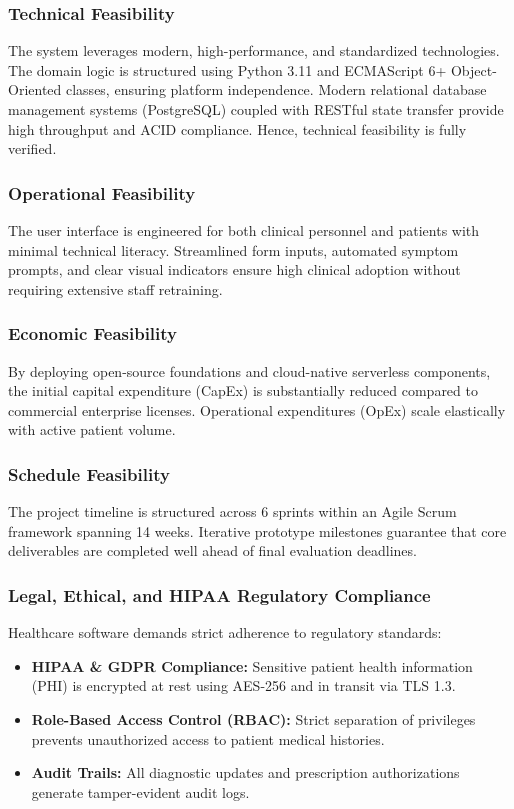 \documentclass[11pt,a4paper]{article}
\begin{document}
\subsubsection{Technical Feasibility}
The system leverages modern, high-performance, and standardized technologies. The domain logic is structured using Python 3.11 and ECMAScript 6+ Object-Oriented classes, ensuring platform independence. Modern relational database management systems (PostgreSQL) coupled with RESTful state transfer provide high throughput and ACID compliance. Hence, technical feasibility is fully verified.

\subsubsection{Operational Feasibility}
The user interface is engineered for both clinical personnel and patients with minimal technical literacy. Streamlined form inputs, automated symptom prompts, and clear visual indicators ensure high clinical adoption without requiring extensive staff retraining.

\subsubsection{Economic Feasibility}
By deploying open-source foundations and cloud-native serverless components, the initial capital expenditure (CapEx) is substantially reduced compared to commercial enterprise licenses. Operational expenditures (OpEx) scale elastically with active patient volume.

\subsubsection{Schedule Feasibility}
The project timeline is structured across 6 sprints within an Agile Scrum framework spanning 14 weeks. Iterative prototype milestones guarantee that core deliverables are completed well ahead of final evaluation deadlines.

\subsubsection{Legal, Ethical, and HIPAA Regulatory Compliance}
Healthcare software demands strict adherence to regulatory standards:
\begin{itemize}
    \item \textbf{HIPAA \& GDPR Compliance:} Sensitive patient health information (PHI) is encrypted at rest using AES-256 and in transit via TLS 1.3.
    \item \textbf{Role-Based Access Control (RBAC):} Strict separation of privileges prevents unauthorized access to patient medical histories.
    \item \textbf{Audit Trails:} All diagnostic updates and prescription authorizations generate tamper-evident audit logs.
\end{itemize}
\end{document}

